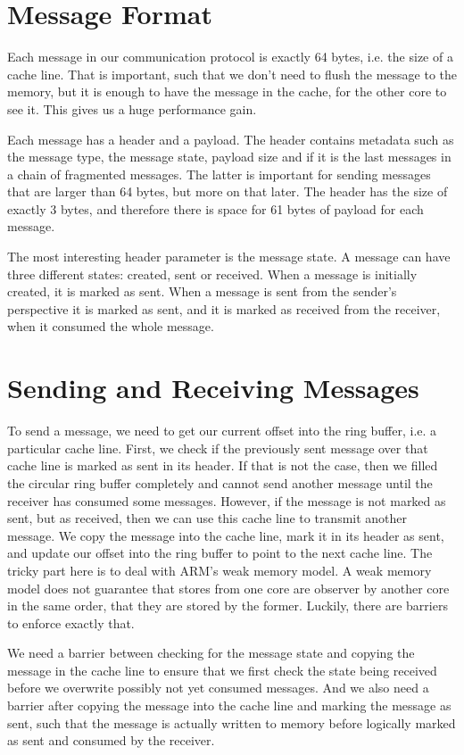 \section{Message Format}

Each message in our communication protocol is exactly 64 bytes, i.e. the size of
a cache line. That is important, such that we don't need to flush the message to
the memory, but it is enough to have the message in the cache, for the other
core to see it. This gives us a huge performance gain.

Each message has a header and a payload. The header contains metadata such as
the message type, the message state, payload size and if it is the last messages
in a chain of fragmented messages. The latter is important for sending messages
that are larger than 64 bytes, but more on that later. The header has the size
of exactly 3 bytes, and therefore there is space for 61 bytes of payload for
each message.

The most interesting header parameter is the message state. A message can have
three different states: created, sent or received. When a message is initially
created, it is marked as sent. When a message is sent from the sender's
perspective it is marked as sent, and it is marked as received from the
receiver, when it consumed the whole message.

\section{Sending and Receiving Messages}

To send a message, we need to get our current offset into the ring buffer, i.e.
a particular cache line. First, we check if the previously sent message over
that cache line is marked as sent in its header. If that is not the case, then
we filled the circular ring buffer completely and cannot send another message
until the receiver has consumed some messages. However, if the message is not
marked as sent, but as received, then we can use this cache line to transmit
another message. We copy the message into the cache line, mark it in its header
as sent, and update our offset into the ring buffer to point to the next cache
line. The tricky part here is to deal with ARM's weak memory model. A weak
memory model does not guarantee that stores from one core are observer by
another core in the same order, that they are stored by the former. Luckily,
there are barriers to enforce exactly that.

We need a barrier between checking for the message state and copying the message
in the cache line to ensure that we first check the state being received before
we overwrite possibly not yet consumed messages. And we also need a barrier
after copying the message into the cache line and marking the message as sent,
such that the message is actually written to memory before logically marked as
sent and consumed by the receiver.

